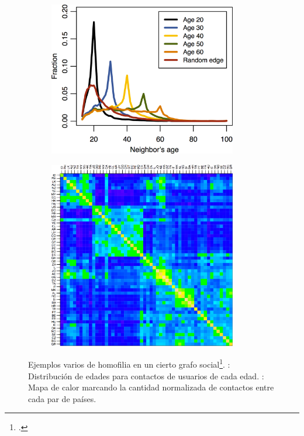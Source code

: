 \documentclass[usenames,dvipsnames,table]{beamer}
\begin{document}
\begin{frame}
	\begin{figure}
		\begin{subfigure}[b]{0.48\framewidth}
			\includegraphics[width=0.9\textwidth]{age_homophily.png}
			\caption{}%
			\label{fig:age_homophily}
		\end{subfigure}
		\begin{subfigure}[b]{0.48\framewidth}
			\hfill{}
			\includegraphics[width=0.9\textwidth]{country_homophily.png}
			\caption{}%
			\label{fig:country_homophily}
		\end{subfigure}
		\caption{Ejemplos varios de homofilia en un cierto grafo social\footcite{ugander2011anatomy}. : Distribución de edades para contactos de usuarios de cada edad. : Mapa de calor marcando la cantidad normalizada de contactos entre cada par de países.}
	\end{figure}


\end{frame}
\end{document}
